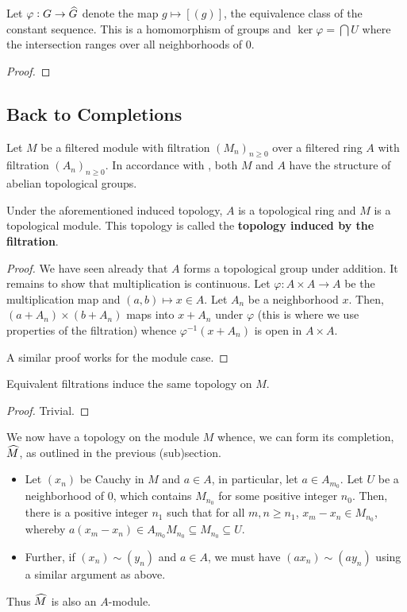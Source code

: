 \begin{proposition}
    Let $\varphi: G\to\widehat{G}$ denote the map $g\mapsto[(g)]$, the equivalence class of the constant sequence. This is a homomorphism of groups and $\ker\varphi = \bigcap U$ where the intersection ranges over all neighborhoods of $0$.
\end{proposition}
\begin{proof}
\end{proof}

\subsection*{Back to Completions}

Let $M$ be a filtered module with filtration $(M_n)_{n\ge 0}$ over a filtered ring $A$ with filtration $(A_n)_{n\ge 0}$. In accordance with , both $M$ and $A$ have the structure of abelian topological groups.

\begin{proposition}
    Under the aforementioned induced topology, $A$ is a topological ring and $M$ is a topological module. This topology is called the \textbf{topology induced by the filtration}.
\end{proposition}
\begin{proof}
    We have seen already that $A$ forms a topological group under addition. It remains to show that multiplication is continuous. Let $\varphi: A\times A\to A$ be the multiplication map and $(a,b)\mapsto x\in A$. Let $A_n$ be a neighborhood $x$. Then, $(a + A_n)\times(b + A_n)$ maps into $x + A_n$ under $\varphi$ (this is where we use properties of the filtration) whence $\varphi^{-1}(x + A_n)$ is open in $A\times A$.

    A similar proof works for the module case.
\end{proof}

\begin{proposition}
    Equivalent filtrations induce the same topology on $M$.
\end{proposition}
\begin{proof}
    Trivial.
\end{proof}

We now have a topology on the module $M$ whence, we can form its completion, $\widehat{M}$, as outlined in the previous (sub)section.
\begin{itemize}
    \item Let $(x_n)$ be Cauchy in $M$ and $a\in A$, in particular, let $a\in A_{m_0}$. Let $U$ be a neighborhood of $0$, which contains $M_{n_0}$ for some positive integer $n_0$. Then, there is a positive integer $n_1$ such that for all $m,n\ge n_1$, $x_m - x_n\in M_{n_0}$, whereby $a(x_m - x_n)\in A_{m_0}M_{n_0}\subseteq M_{n_0}\subseteq U$.

    \item Further, if $(x_n)\sim (y_n)$ and $a\in A$, we must have $(ax_n)\sim (ay_n)$ using a similar argument as above.
\end{itemize}
Thus $\widehat{M}$ is also an $A$-module.

